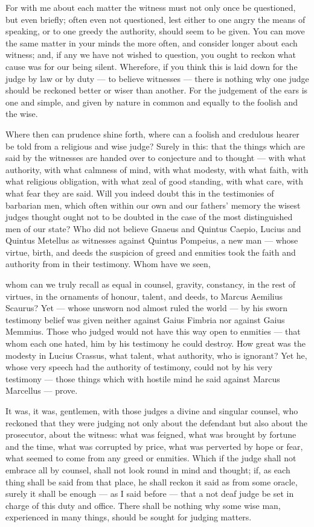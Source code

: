  For with me about each matter the witness must not only once be questioned, but even briefly; often even not questioned, lest either to one angry the means of speaking, or to one greedy the authority, should seem to be given. You can move the same matter in your minds the more often, and consider longer about each witness; and, if any we have not wished to question, you ought to reckon what cause was for our being silent. Wherefore, if you think this is laid down for the judge by law or by duty --- to believe witnesses --- there is nothing why one judge should be reckoned better or wiser than another. For the judgement of the ears is one and simple, and given by nature in common and equally to the foolish and the wise.

 Where then can prudence shine forth, where can a foolish and credulous hearer be told from a religious and wise judge? Surely in this: that the things which are said by the witnesses are handed over to conjecture and to thought --- with what authority, with what calmness of mind, with what modesty, with what faith, with what religious obligation, with what zeal of good standing, with what care, with what fear they are said. Will you indeed doubt this in the testimonies of barbarian men, which often within our own and our fathers' memory the wisest judges thought ought not to be doubted in the case of the most distinguished men of our state? Who did not believe Gnaeus and Quintus Caepio, Lucius and Quintus Metellus as witnesses against Quintus Pompeius, a new man --- whose virtue, birth, and deeds the suspicion of greed and enmities took the faith and authority from in their testimony. Whom have we seen,

 whom can we truly recall as equal in counsel, gravity, constancy, in the rest of virtues, in the ornaments of honour, talent, and deeds, to Marcus Aemilius Scaurus? Yet --- whose unsworn nod almost ruled the world --- by his sworn testimony belief was given neither against Gaius Fimbria nor against Gaius Memmius. Those who judged would not have this way open to enmities --- that whom each one hated, him by his testimony he could destroy. How great was the modesty in Lucius Crassus, what talent, what authority, who is ignorant? Yet he, whose very speech had the authority of testimony, could not by his very testimony --- those things which with hostile mind he said against Marcus Marcellus --- prove.

 It was, it was, gentlemen, with those judges a divine and singular counsel, who reckoned that they were judging not only about the defendant but also about the prosecutor, about the witness: what was feigned, what was brought by fortune and the time, what was corrupted by price, what was perverted by hope or fear, what seemed to come from any greed or enmities. Which if the judge shall not embrace all by counsel, shall not look round in mind and thought; if, as each thing shall be said from that place, he shall reckon it said as from some oracle, surely it shall be enough --- as I said before --- that a not deaf judge be set in charge of this duty and office. There shall be nothing why some wise man, experienced in many things, should be sought for judging matters.


